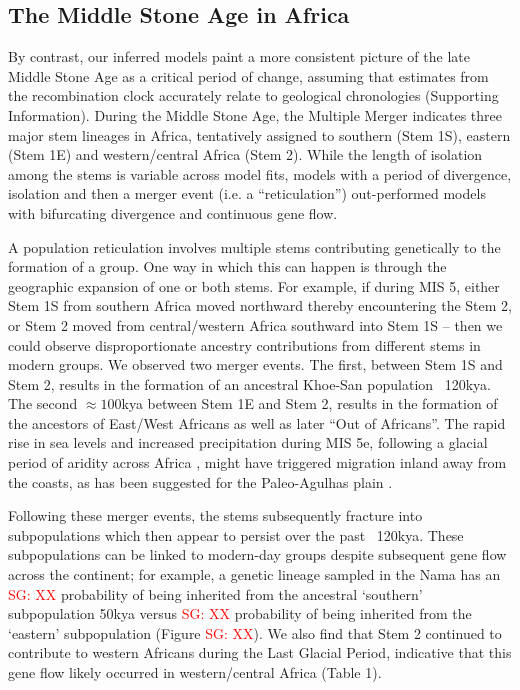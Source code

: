 \documentclass[]{article}
\newcommand{\sgcomment}[1]{{\textcolor{red}{SG: #1}}}
\begin{document}
\subsection*{The Middle Stone Age in Africa}

By contrast, our inferred models paint a more consistent picture of the late
Middle Stone Age as a critical period of change, assuming that estimates from
the recombination clock accurately relate to geological chronologies
(Supporting Information).
During the Middle Stone Age, the Multiple Merger indicates three
major stem lineages in Africa, tentatively assigned to southern (Stem 1S),
eastern (Stem 1E) and western/central Africa (Stem 2). While the length of
isolation among the stems is variable across model fits, models with a period of 
divergence, isolation and then a merger event (i.e. a “reticulation”)
out-performed models with bifurcating divergence and continuous gene flow. 

A population reticulation involves multiple stems contributing genetically to
the formation of a group. One way in which this can happen is through the
geographic expansion of one or both stems. For example, if during MIS 5, either
Stem 1S from southern Africa moved northward thereby encountering the Stem 2,
or Stem 2 moved from central/western Africa southward into Stem 1S -- then we
could observe disproportionate ancestry contributions from different stems in
modern groups. We observed two merger events. The first, between Stem 1S and
Stem 2, results in the formation of an ancestral Khoe-San population ~120kya.
The second $\approx100$kya between Stem 1E and Stem 2, results in the formation of the
ancestors of East/West Africans as well as later “Out of Africans”. The rapid
rise in sea levels and increased precipitation during MIS 5e, following a
glacial period of aridity across Africa \citep{Blome2012-lw}, might have
triggered migration inland away from the coasts, as has been suggested for the
Paleo-Agulhas plain \citep{Marean2014-pg}. 

Following these merger events, the stems subsequently fracture into
subpopulations which then appear to persist over the past ~120kya. These
subpopulations can be linked to modern-day groups despite subsequent gene flow
across the continent; for example, a genetic lineage sampled in the Nama has an
\sgcomment{XX} probability of being inherited from the ancestral ‘southern’ subpopulation 50kya versus
\sgcomment{XX} probability of being inherited from the ‘eastern’ subpopulation (Figure \sgcomment{XX}). We also
find that Stem 2 continued to contribute to western Africans during the Last
Glacial Period, indicative that this gene flow likely occurred in
western/central Africa (Table 1). 
\end{document}
